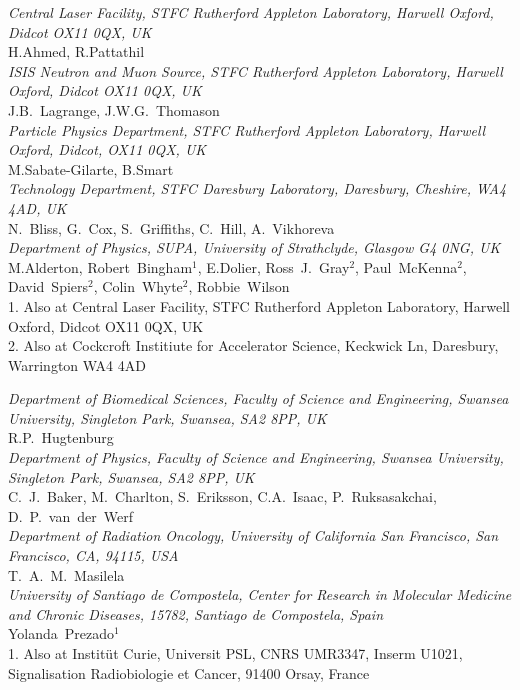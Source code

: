 \noindent \textit{Central Laser Facility, STFC Rutherford Appleton Laboratory, Harwell Oxford, Didcot OX11 0QX, UK} \\
H.Ahmed, R.Pattathil \\
 
\noindent \textit{ISIS Neutron and Muon Source, STFC Rutherford Appleton Laboratory, Harwell Oxford, Didcot OX11 0QX, UK} \\
J.B.~Lagrange, J.W.G.~Thomason \\
 
\noindent \textit{Particle Physics Department, STFC Rutherford Appleton Laboratory, Harwell Oxford, Didcot, OX11 0QX, UK} \\
M.Sabate-Gilarte, B.Smart \\
 
\noindent \textit{Technology Department, STFC Daresbury Laboratory, Daresbury, Cheshire, WA4 4AD, UK} \\
N.~Bliss, G.~Cox, S.~Griffiths, C.~Hill, A.~Vikhoreva \\
 
\noindent \textit{Department of Physics, SUPA, University of Strathclyde, Glasgow G4 0NG, UK} \\
M.Alderton, Robert~Bingham$^{1}$, E.Dolier, Ross~J.~Gray$^{2}$, Paul~McKenna$^{2}$, David~Spiers$^{2}$, Colin~Whyte$^{2}$, Robbie~Wilson \\
{\footnotesize
  1. Also at Central Laser Facility, STFC Rutherford Appleton Laboratory, Harwell Oxford, Didcot OX11 0QX, UK \\
  2. Also at Cockcroft Institiute for Accelerator Science, Keckwick Ln, Daresbury, Warrington WA4 4AD \\
}
 
\noindent \textit{Department of Biomedical Sciences, Faculty of Science and Engineering, Swansea University, Singleton Park, Swansea, SA2 8PP, UK} \\
R.P.~Hugtenburg \\
 
\noindent \textit{Department of Physics, Faculty of Science and Engineering, Swansea University, Singleton Park, Swansea, SA2 8PP, UK} \\
C.~J.~Baker, M.~Charlton, S.~Eriksson, C.A.~Isaac, P.~Ruksasakchai, D.~P.~van~der~Werf \\
 
\noindent \textit{Department of Radiation Oncology, University of California San Francisco, San Francisco, CA, 94115, USA} \\
T.~A.~M.~Masilela \\
 
\noindent \textit{University of Santiago de Compostela, Center for Research in Molecular Medicine and Chronic Diseases, 15782, Santiago de Compostela, Spain} \\
Yolanda~Prezado$^{1}$ \\
{\footnotesize
  1. Also at Instit\"ut Curie, Universit PSL, CNRS UMR3347, Inserm U1021, Signalisation Radiobiologie et Cancer, 91400 Orsay, France \\
}
 
\vspace{0.5cm}
